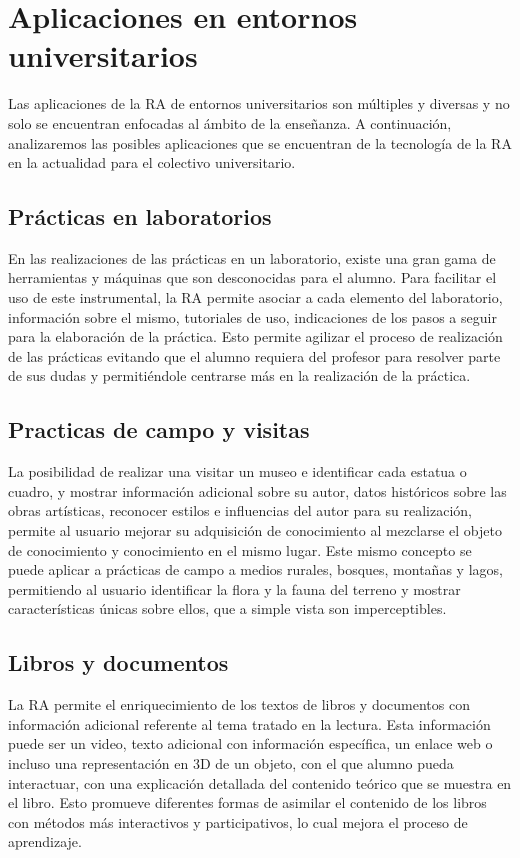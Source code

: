 \section{Aplicaciones en entornos universitarios}

Las aplicaciones de la RA de entornos universitarios son múltiples y diversas y no solo se encuentran enfocadas al ámbito de la enseñanza. A continuación, analizaremos las posibles aplicaciones que se encuentran de la tecnología de la RA en la actualidad para el colectivo universitario.

\subsection{Prácticas en laboratorios} 
En las realizaciones de las prácticas en un laboratorio, existe una gran gama de herramientas y máquinas que son desconocidas para el alumno. Para facilitar el uso de este instrumental, la RA permite asociar a cada elemento del laboratorio, información sobre el mismo, tutoriales de uso, indicaciones de los pasos a seguir para la elaboración de la práctica. Esto permite agilizar el proceso de realización de las prácticas evitando que el alumno requiera del profesor para resolver parte de sus dudas y permitiéndole centrarse más en la realización de la práctica.

\subsection{Practicas de campo y visitas} 

La posibilidad de realizar una visitar un museo e identificar cada estatua o cuadro, y mostrar información adicional sobre su autor, datos históricos sobre las obras artísticas, reconocer estilos e influencias del autor para su realización, permite al usuario mejorar su adquisición de conocimiento al mezclarse el objeto de conocimiento y conocimiento en el mismo lugar. Este mismo concepto se puede aplicar a prácticas de campo a medios rurales, bosques, montañas y lagos, permitiendo al usuario identificar la flora y la fauna del terreno y mostrar características únicas sobre ellos, que a simple vista son imperceptibles. 
 
\subsection{Libros y documentos}

La RA permite el enriquecimiento de los textos de libros y documentos con información adicional referente al tema tratado en la lectura. Esta información puede ser un video, texto adicional con información específica, un enlace web o incluso una representación en 3D de un objeto, con el que alumno pueda interactuar, con una explicación detallada del contenido teórico que se muestra en el libro. Esto promueve diferentes formas de asimilar el contenido de los libros con métodos más interactivos y participativos, lo cual mejora el proceso de aprendizaje.

